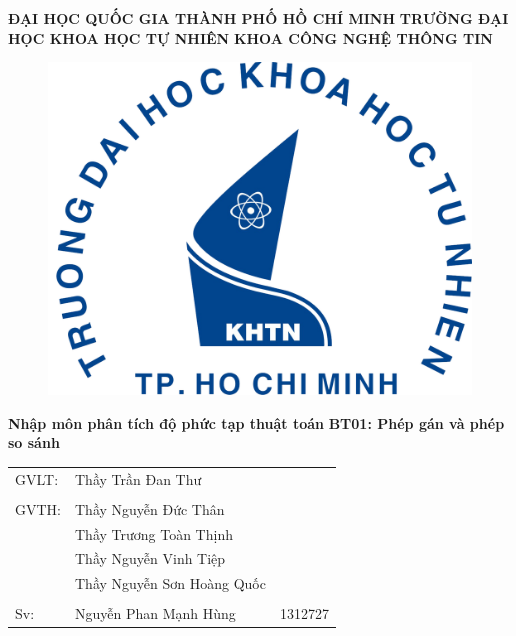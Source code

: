 \documentclass{article}
\begin{document}
\begin{titlepage}
\begin{center}
	\large{\textbf{ĐẠI HỌC QUỐC GIA THÀNH PHỐ HỒ CHÍ MINH}}
	\large{\textbf{TRƯỜNG ĐẠI HỌC KHOA HỌC TỰ NHIÊN}}
	\large{\textbf{KHOA CÔNG NGHỆ THÔNG TIN}}
	
	\begin{figure}[H]
		\centerline{\includegraphics[scale = 0.5]{logo}}
	\end{figure}

	\Large{\textbf{Nhập môn phân tích độ phức tạp thuật toán}}
	\Large{\textbf{BT01: Phép gán và phép so sánh}}

\end{center}
	\vfill
\begin{flushright}
	
	\begin{tabular}{l l l}
		GVLT: &Thầy Trần Đan Thư\\
		&\\
		GVTH: &Thầy Nguyễn Đức Thân\\
		&Thầy Trương Toàn Thịnh\\
		&Thầy Nguyễn Vinh Tiệp\\
		&Thầy Nguyễn Sơn Hoàng Quốc\\
		&\\
		Sv: &Nguyễn Phan Mạnh Hùng & 1312727\\
	\end{tabular}
\end{flushright}

\vfill
\end{titlepage}
\pagebreak
\thispagestyle{empty}
\tableofcontents{}
\pagebreak
\end{document}
